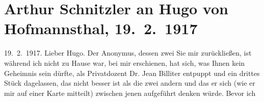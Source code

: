 

         
         \renewcommand{\erwaehntePersonen}{Personen: Jean Billiter, Hugo von Hofmannsthal}
         \renewcommand{\erwaehnteOrte}{Orte: Burgtheater, Wien}
         \renewcommand{\erwaehnteWerke}{}
               \section[Arthur Schnitzler an Hugo von Hofmannsthal, 19. 2. 1917]{ Arthur Schnitzler an Hugo von Hofmannsthal, 19. 2. 1917}\nopagebreak{}\rehead{ }\begin{ledgroupsized}[t]{13cm}\normalsize\beginnumbering{} \toendnotes[C]{\smallbreak\pagebreak[2]} \toendnotes[C]{\smallbreak}\pstart
           \noindent{}{\pb}\label{K_L02256-1v}\label{K_L02256-1h}\hfill 19. 2. 1917.\pend
           \pstart{}Lieber Hugo.\pend\pstart
           Der Anonymus, dessen zwei
                  \label{K_L02256-2v}\label{K_L02256-2h}{ }Sie mir zurückließen, ist \label{K_L02256-3v}\label{K_L02256-3h} während ich nicht zu Hause war, bei mir erschienen, hat sich, was Ihnen kein
               Geheimnis sein dürfte, als Privatdozent Dr. Jean
                  Billiter entpuppt und ein drittes Stück dagelassen, das nicht besser ist als
               die zwei andern und das er sich (wie er mir auf einer Karte mitteilt) zwischen jenen
               aufgeführt denken würde. Bevor ich \label{K_L02256-4v}
\end{ledgroupsized}
